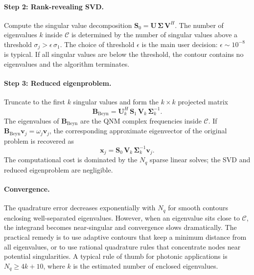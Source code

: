 \paragraph{Step 2: Rank-revealing SVD.}
Compute the singular value decomposition
$\mathbf{S}_0 = \mathbf{U}\,\boldsymbol{\Sigma}\,\mathbf{V}^H$.
The number of eigenvalues $k$ inside $\mathcal{C}$ is determined by the
number of singular values above a threshold $\sigma_j > \epsilon\,\sigma_1$.
The choice of threshold $\epsilon$ is the main user decision:
$\epsilon \sim 10^{-8}$ is typical. If all singular values are below
the threshold, the contour contains no eigenvalues and the algorithm
terminates.

\paragraph{Step 3: Reduced eigenproblem.}
Truncate to the first $k$ singular values and form the $k \times k$
projected matrix
\begin{equation}
 \mathbf{B}_{\mathrm{Beyn}}
 = \mathbf{U}_k^H\,\mathbf{S}_1\,\mathbf{V}_k\,
 \boldsymbol{\Sigma}_k^{-1}.
 \label{eq:beyn-reduced}
\end{equation}
The eigenvalues of $\mathbf{B}_{\mathrm{Beyn}}$ are the QNM complex
frequencies inside $\mathcal{C}$. If
$\mathbf{B}_{\mathrm{Beyn}}\mathbf{v}_j=\omega_j\mathbf{v}_j$, the
corresponding approximate eigenvector of the original problem is
recovered as
\begin{equation}
 \mathbf{x}_j =
 \mathbf{S}_0\,\mathbf{V}_k\,\boldsymbol{\Sigma}_k^{-1}\mathbf{v}_j .
 \label{eq:beyn-eigenvector}
\end{equation}
The computational cost is dominated by the $N_q$ sparse linear solves;
the SVD and reduced eigenproblem are negligible.

\paragraph{Convergence.}
The quadrature error decreases exponentially with $N_q$ for smooth
contours enclosing well-separated eigenvalues. However, when an
eigenvalue sits close to $\mathcal{C}$, the integrand becomes
near-singular and convergence slows dramatically. The practical remedy
is to use adaptive contours that keep a minimum distance from all
eigenvalues, or to use rational quadrature rules that concentrate nodes
near potential singularities. A typical rule of thumb for photonic
applications is $N_q \ge 4k + 10$, where $k$ is the estimated number
of enclosed eigenvalues.

